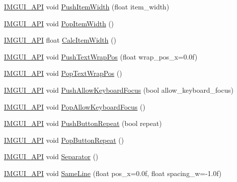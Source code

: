 \begin{DoxyCompactItemize}
\item 
\mbox{\hyperlink{imgui_8h_a43829975e84e45d1149597467a14bbf5}{I\+M\+G\+U\+I\+\_\+\+A\+PI}} void \mbox{\hyperlink{namespace_im_gui_a4ad13bf38f0521a339133248ef3e3036}{Push\+Item\+Width}} (float item\+\_\+width)
\item 
\mbox{\hyperlink{imgui_8h_a43829975e84e45d1149597467a14bbf5}{I\+M\+G\+U\+I\+\_\+\+A\+PI}} void \mbox{\hyperlink{namespace_im_gui_ad29a3fc0cb5dfc7f9fc7224512ce90bf}{Pop\+Item\+Width}} ()
\item 
\mbox{\hyperlink{imgui_8h_a43829975e84e45d1149597467a14bbf5}{I\+M\+G\+U\+I\+\_\+\+A\+PI}} float \mbox{\hyperlink{namespace_im_gui_ab3b3ba92ebd8bca4a552dd93321a1994}{Calc\+Item\+Width}} ()
\item 
\mbox{\hyperlink{imgui_8h_a43829975e84e45d1149597467a14bbf5}{I\+M\+G\+U\+I\+\_\+\+A\+PI}} void \mbox{\hyperlink{namespace_im_gui_ab3b203dc94e7ee61a524609b3f3be50a}{Push\+Text\+Wrap\+Pos}} (float wrap\+\_\+pos\+\_\+x=0.\+0f)
\item 
\mbox{\hyperlink{imgui_8h_a43829975e84e45d1149597467a14bbf5}{I\+M\+G\+U\+I\+\_\+\+A\+PI}} void \mbox{\hyperlink{namespace_im_gui_a08000421b9cc13757430efe54178ae0f}{Pop\+Text\+Wrap\+Pos}} ()
\item 
\mbox{\hyperlink{imgui_8h_a43829975e84e45d1149597467a14bbf5}{I\+M\+G\+U\+I\+\_\+\+A\+PI}} void \mbox{\hyperlink{namespace_im_gui_adf7c3cfdcbb06617bb70ff1526d064f4}{Push\+Allow\+Keyboard\+Focus}} (bool allow\+\_\+keyboard\+\_\+focus)
\item 
\mbox{\hyperlink{imgui_8h_a43829975e84e45d1149597467a14bbf5}{I\+M\+G\+U\+I\+\_\+\+A\+PI}} void \mbox{\hyperlink{namespace_im_gui_a017db69016de97685aec978e504dc96d}{Pop\+Allow\+Keyboard\+Focus}} ()
\item 
\mbox{\hyperlink{imgui_8h_a43829975e84e45d1149597467a14bbf5}{I\+M\+G\+U\+I\+\_\+\+A\+PI}} void \mbox{\hyperlink{namespace_im_gui_a61d3e0191d67bedaf45f0178f87e3125}{Push\+Button\+Repeat}} (bool repeat)
\item 
\mbox{\hyperlink{imgui_8h_a43829975e84e45d1149597467a14bbf5}{I\+M\+G\+U\+I\+\_\+\+A\+PI}} void \mbox{\hyperlink{namespace_im_gui_a0f883e8507be797ca8ba1448d2b9dbb0}{Pop\+Button\+Repeat}} ()
\item 
\mbox{\hyperlink{imgui_8h_a43829975e84e45d1149597467a14bbf5}{I\+M\+G\+U\+I\+\_\+\+A\+PI}} void \mbox{\hyperlink{namespace_im_gui_a191123597a5084d003c8beac7eeb029e}{Separator}} ()
\item 
\mbox{\hyperlink{imgui_8h_a43829975e84e45d1149597467a14bbf5}{I\+M\+G\+U\+I\+\_\+\+A\+PI}} void \mbox{\hyperlink{namespace_im_gui_a9a01bed1445b5b7edaf0af6a31c08d2c}{Same\+Line}} (float pos\+\_\+x=0.\+0f, float spacing\+\_\+w=-\/1.\+0f)

\end{DoxyCompactItemize}
